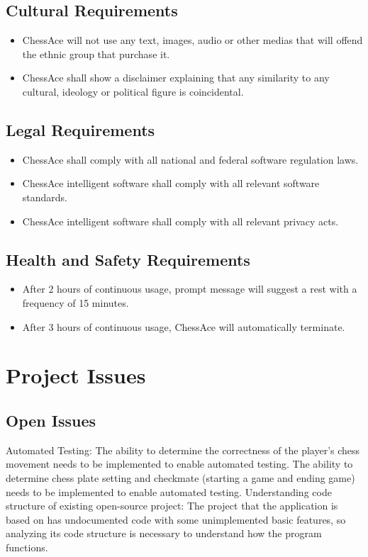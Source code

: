 \documentclass[12pt, titlepage]{article}
\begin{document}
\subsection{Cultural Requirements}
\begin{itemize}
\item ChessAce will not use any text, images, audio or other medias that will offend the ethnic group that purchase it.
\item ChessAce shall show a disclaimer explaining that any similarity to any cultural, ideology or political figure is coincidental.
\end{itemize}
\subsection{Legal Requirements}
\begin{itemize}
\item ChessAce shall comply with all national and federal software regulation laws.
\item ChessAce intelligent software shall comply with all relevant software standards.
\item ChessAce intelligent software shall comply with all relevant privacy acts.
\end{itemize}
\subsection{Health and Safety Requirements}
\begin{itemize}
\item After 2 hours of continuous usage, prompt message will suggest a rest with a frequency of 15 minutes.
\item After 3 hours of continuous usage, ChessAce will automatically terminate.
\end{itemize}

\section{Project Issues}

\subsection{Open Issues}
Automated Testing:
The ability to determine the correctness of the player's chess movement needs to be implemented to enable automated testing.
The ability to determine chess plate setting and checkmate (starting a game and ending game) needs to be implemented to enable automated testing.
\medskip \newline
Understanding code structure of existing open-source project:
The project that the application is based on has undocumented code with some unimplemented basic features, so analyzing its code structure is necessary to understand how the program functions.
\end{document}
